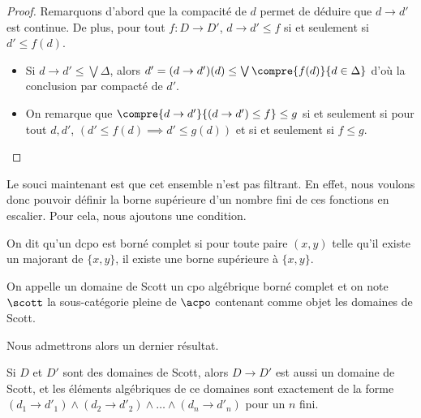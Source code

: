 \begin{proof}
    Remarquons d'abord que la compacité de $d$ permet de déduire que $d\to d'$ est continue. De plus, pour tout $f : D \to D'$, $d\to d' \leq f$ si et seulement si $d'\leq f(d)$.
    
    \begin{itemize}[label=$\bullet$]
        \item Si $d\to d'\leq \bigvee\Delta$, alors $d'=(d\to d')(d)\leq\bigvee\compre{f(d)}{d\in\Delta}$ d'où la conclusion par compacté de $d'$.
        \item On remarque que $\compre{d\to d'}{(d\to d')\leq f}\leq g$ si et seulement si pour tout $d,d'$, $(d'\leq f(d)\implies d'\leq g(d))$ et si et seulement si $f\leq g$.
    \end{itemize}
\end{proof}

Le souci maintenant est que cet ensemble n'est pas filtrant. En effet, nous voulons donc pouvoir définir la borne supérieure d'un nombre fini de ces fonctions en escalier. Pour cela, nous ajoutons une condition.

\begin{defi}
    On dit qu'un dcpo est borné complet si pour toute paire $(x,y)$ telle qu'il existe un majorant de $\{x,y\}$, il existe une borne supérieure à $\{x,y\}$.
    
    On appelle un domaine de Scott un cpo algébrique borné complet et on note $\scott$ la sous-catégorie pleine de $\acpo$ contenant comme objet les domaines de Scott.
\end{defi}

Nous admettrons alors un dernier résultat.

\begin{them}
    Si $D$ et $D'$ sont des domaines de Scott, alors $D\to D'$ est aussi un domaine de Scott, et les éléments algébriques de ce domaines sont exactement de la forme $(d_1\to d'_1)\wedge (d_2\to d'_2)\wedge\ldots\wedge (d_n\to d'_n)$ pour un $n$ fini.
\end{them}


\newpage